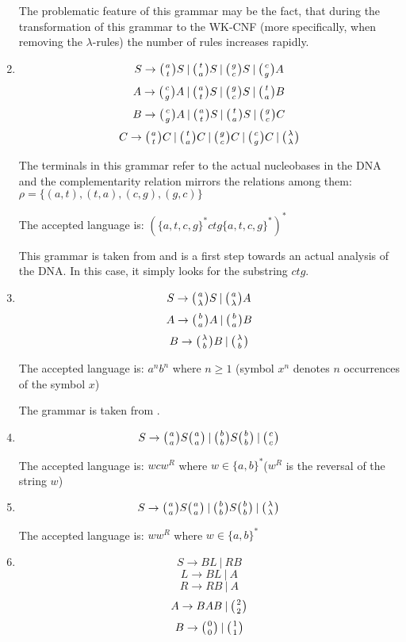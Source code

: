 \begin{enumerate}
{    The problematic feature of this grammar may be the fact, that during the transformation of this grammar to the WK-CNF (more specifically, when removing the $\lambda$-rules) the number of rules increases rapidly.
  }

  \item{
    $$S \rightarrow \wkpair{a}{t} S \:|\: \wkpair{t}{a} S \:|\: \wkpair{g}{c} S \:|\: \wkpair{c}{g} A$$
    $$A \rightarrow \wkpair{c}{g} A \:|\: \wkpair{a}{t} S \:|\: \wkpair{g}{c} S \:|\: \wkpair{t}{a} B$$
    $$B \rightarrow \wkpair{c}{g} A \:|\: \wkpair{a}{t} S \:|\: \wkpair{t}{a} S \:|\: \wkpair{g}{c} C$$
    $$C \rightarrow \wkpair{a}{t} C \:|\: \wkpair{t}{a} C \:|\: \wkpair{g}{c} C \:|\: \wkpair{c}{g} C \:|\: \wkpair{\lambda}{\lambda}$$

     The terminals in this grammar refer to the actual nucleobases in the DNA and the complementarity relation mirrors the relations among them: $\rho = \{(a, t), (t, a), (c, g), (g, c)\}$

    The accepted language is: $(\{a,t,c,g\}^*ctg\{a,t,c,g\}^*)^*$

    This grammar is taken from \cite{WK_GRAMMARS_1} and is a first step towards an actual analysis of the DNA. In this case, it simply looks for the substring $ctg$.
  }

  \item{
    $$S \rightarrow \wkpair{a}{\lambda} S \:|\: \wkpair{a}{\lambda} A$$
    $$A \rightarrow \wkpair{b}{a} A \:|\: \wkpair{b}{a} B$$
    $$B \rightarrow \wkpair{\lambda}{b} B \:|\: \wkpair{\lambda}{b}$$


    The accepted language is: $a^nb^n$ where $n \geq 1$ (symbol $x^n$ denotes $n$ occurrences of the symbol $x$)

    The grammar is taken from \cite{REG_GRAMMAR}.
  }

  \item{
    $$S \rightarrow \wkpair{a}{a} S \wkpair{a}{a} \:|\: \wkpair{b}{b} S \wkpair{b}{b} \:|\: \wkpair{c}{c}$$

    The accepted language is: $wcw^R$ where $w \in \{a, b\}^*$($w^R$ is the reversal of the string $w$)
  }

  \item{
    $$S \rightarrow \wkpair{a}{a} S \wkpair{a}{a} \:|\: \wkpair{b}{b} S \wkpair{b}{b} \:|\: \wkpair{\lambda}{\lambda}$$

    The accepted language is: $ww^R$ where $w \in \{a, b\}^*$
  }

  \item{
    $$S \rightarrow B L \:|\: R B$$
    $$L \rightarrow B L \:|\: A$$
    $$R \rightarrow R B \:|\: A$$
    $$A \rightarrow B A B \:|\: \wkpair{2}{2}$$
    $$B \rightarrow \wkpair{0}{0} \:|\: \wkpair{1}{1}$$

}
\end{enumerate}
